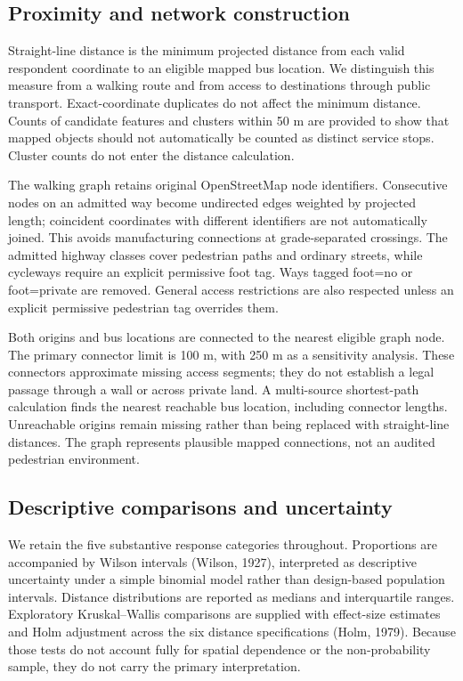 \documentclass[
  11pt,
  a4paper,
]{article}
\begin{document}
\subsection{Proximity and network
construction}\label{proximity-and-network-construction}

Straight-line distance is the minimum projected distance from each valid
respondent coordinate to an eligible mapped bus location. We distinguish
this measure from a walking route and from access to destinations
through public transport. Exact-coordinate duplicates do not affect the
minimum distance. Counts of candidate features and clusters within 50 m
are provided to show that mapped objects should not automatically be
counted as distinct service stops. Cluster counts do not enter the
distance calculation.

The walking graph retains original OpenStreetMap node identifiers.
Consecutive nodes on an admitted way become undirected edges weighted by
projected length; coincident coordinates with different identifiers are
not automatically joined. This avoids manufacturing connections at
grade-separated crossings. The admitted highway classes cover pedestrian
paths and ordinary streets, while cycleways require an explicit
permissive foot tag. Ways tagged foot=no or foot=private are removed.
General access restrictions are also respected unless an explicit
permissive pedestrian tag overrides them.

Both origins and bus locations are connected to the nearest eligible
graph node. The primary connector limit is 100 m, with 250 m as a
sensitivity analysis. These connectors approximate missing access
segments; they do not establish a legal passage through a wall or across
private land. A multi-source shortest-path calculation finds the nearest
reachable bus location, including connector lengths. Unreachable origins
remain missing rather than being replaced with straight-line distances.
The graph represents plausible mapped connections, not an audited
pedestrian environment.

\subsection{Descriptive comparisons and
uncertainty}\label{descriptive-comparisons-and-uncertainty}

We retain the five substantive response categories throughout.
Proportions are accompanied by Wilson intervals (Wilson, 1927),
interpreted as descriptive uncertainty under a simple binomial model
rather than design-based population intervals. Distance distributions
are reported as medians and interquartile ranges. Exploratory
Kruskal--Wallis comparisons are supplied with effect-size estimates and
Holm adjustment across the six distance specifications (Holm, 1979).
Because those tests do not account fully for spatial dependence or the
non-probability sample, they do not carry the primary interpretation.
\end{document}
